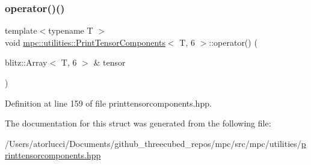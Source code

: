 \subsubsection{\texorpdfstring{operator()()}{operator()()}}
{\footnotesize\ttfamily template$<$typename T $>$ \\
void \mbox{\hyperlink{structmpc_1_1utilities_1_1_print_tensor_components}{mpc\+::utilities\+::\+Print\+Tensor\+Components}}$<$ T, 6 $>$\+::operator() (\begin{DoxyParamCaption}\item[{blitz\+::\+Array$<$ T, 6 $>$ \&}]{tensor }\end{DoxyParamCaption})\hspace{0.3cm}{\ttfamily [inline]}}



Definition at line 159 of file printtensorcomponents.\+hpp.



The documentation for this struct was generated from the following file\+:\begin{DoxyCompactItemize}
\item 
/\+Users/atorlucci/\+Documents/github\+\_\+threecubed\+\_\+repos/mpc/src/mpc/utilities/\mbox{\hyperlink{printtensorcomponents_8hpp}{printtensorcomponents.\+hpp}}\end{DoxyCompactItemize}

